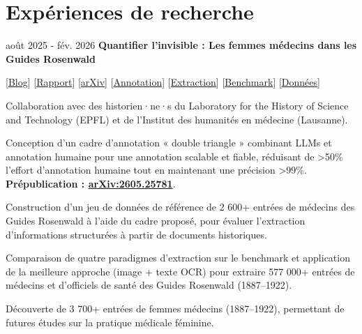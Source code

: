 \section{Expériences de recherche}

        \begin{twocolentry}{
            août 2025 - fév. 2026
        }
            \textbf{Quantifier l'invisible : Les femmes médecins dans les Guides Rosenwald}

            [\href{https://medif.hypotheses.org/2006}{Blog}] [\href{https://renyi.ch/reports/rosenwald.pdf}{Rapport}] [\href{https://arxiv.org/abs/2605.25781}{arXiv}] [\href{https://github.com/nmrenyi/double-triangle-annotation}{Annotation}] [\href{https://github.com/nmrenyi/extraire-tesseract-openai}{Extraction}] [\href{https://github.com/nmrenyi/rosenwald-benchmark}{Benchmark}] [\href{https://github.com/nmrenyi/rosenwald-extraction}{Données}]
        \end{twocolentry}
        \vspace{0.10 cm}
        \begin{onecolentry}
        \begin{highlights}

    \item Collaboration avec des historien·ne·s du Laboratory for the History of Science and Technology (EPFL) et de l'Institut des humanit\'es en m\'edecine (Lausanne).
    \item Conception d'un cadre d'annotation « double triangle » combinant LLMs et annotation humaine pour une annotation scalable et fiable, réduisant de >50\% l'effort d'annotation humaine tout en maintenant une précision >99\%. \textbf{Prépublication : \href{https://arxiv.org/abs/2605.25781}{arXiv:2605.25781}}.
    \item Construction d'un jeu de données de référence de 2 600+ entrées de médecins des Guides Rosenwald à l'aide du cadre proposé, pour évaluer l'extraction d'informations structurées à partir de documents historiques.
    \item Comparaison de quatre paradigmes d'extraction sur le benchmark et application de la meilleure approche (image + texte OCR) pour extraire 577 000+ entrées de médecins et d'officiels de santé des Guides Rosenwald (1887--1922).
    \item Découverte de 3 700+ entrées de femmes médecins (1887--1922), permettant de futures études sur la pratique médicale féminine.
\end{highlights}
        \end{onecolentry}
        \vspace{0.2 cm}

